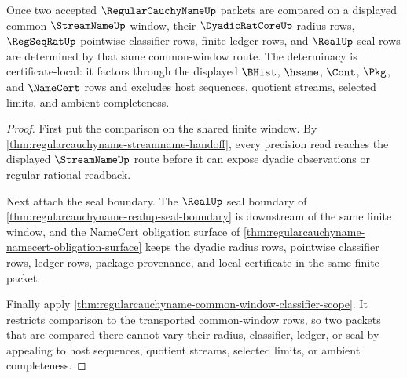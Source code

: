 \begin{theorem}
\label{thm:regularcauchyname-common-window-seal-determinacy}
Once two accepted $\RegularCauchyNameUp$ packets are compared on a displayed common $\StreamNameUp$ window, their $\DyadicRatCoreUp$ radius rows, $\RegSeqRatUp$ pointwise classifier rows, finite ledger rows, and $\RealUp$ seal rows are determined by that same common-window route. The determinacy is certificate-local: it factors through the displayed $\BHist$, $\hsame$, $\Cont$, $\Pkg$, and $\NameCert$ rows and excludes host sequences, quotient streams, selected limits, and ambient completeness.
\end{theorem}
\begin{proof}
First put the comparison on the shared finite window. By \autoref{thm:regularcauchyname-streamname-handoff}, every precision read reaches the displayed $\StreamNameUp$ route before it can expose dyadic observations or regular rational readback.

Next attach the seal boundary. The $\RealUp$ seal boundary of \autoref{thm:regularcauchyname-realup-seal-boundary} is downstream of the same finite window, and the NameCert obligation surface of \autoref{thm:regularcauchyname-namecert-obligation-surface} keeps the dyadic radius rows, pointwise classifier rows, ledger rows, package provenance, and local certificate in the same finite packet.

Finally apply \autoref{thm:regularcauchyname-common-window-classifier-scope}. It restricts comparison to the transported common-window rows, so two packets that are compared there cannot vary their radius, classifier, ledger, or seal by appealing to host sequences, quotient streams, selected limits, or ambient completeness.
\end{proof}

